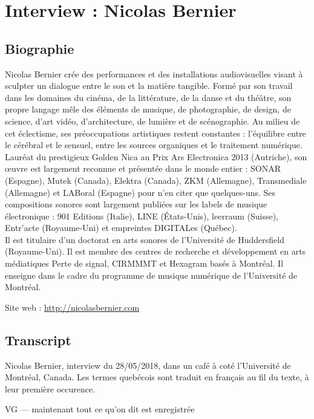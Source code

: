 \chapter{Interview : Nicolas Bernier}
\label{appendix:bernier}

\section*{Biographie}

\noindent Nicolas Bernier crée des performances et des installations audiovisuelles visant à sculpter un dialogue entre le son et la matière tangible. Formé par son travail dans les domaines du cinéma, de la littérature, de la danse et du théâtre, son propre langage mêle des éléments de musique, de photographie, de design, de science, d'art vidéo, d'architecture, de lumière et de scénographie. Au milieu de cet éclectisme, ses préoccupations artistiques restent constantes : l'équilibre entre le cérébral et le sensuel, entre les sources organiques et le traitement numérique.\\
\indent Lauréat du prestigieux Golden Nica au Prix Ars Electronica 2013 (Autriche), son œuvre est largement reconnue et présentée dans le monde entier : SONAR (Espagne), Mutek (Canada), Elektra (Canada), ZKM (Allemagne), Transmediale (Allemagne) et LABoral (Espagne) pour n'en citer que quelques-uns. Ses compositions sonores sont largement publiées sur les labels de musique électronique : 901 Editions (Italie), LINE (États-Unis), leerraum (Suisse), Entr'acte (Royaume-Uni) et empreintes DIGITALes (Québec).\\
\indent Il est titulaire d'un doctorat en arts sonores de l'Université de Huddersfield (Royaume-Uni). Il est membre des centres de recherche et développement en arts médiatiques Perte de signal, CIRMMMT et Hexagram basés à Montréal. Il enseigne dans le cadre du programme de musique numérique de l'Université de Montréal.

\noindent Site web : \url{http://nicolasbernier.com}

\section*{Transcript}

\noindent Nicolas Bernier, interview du 28/05/2018, dans un café à coté l'Université de Montréal, Canada. Les termes quebécois sont traduit en français au fil du texte, à leur première occurence.
 
VG — maintenant tout ce qu'on dit est enregistrée 

